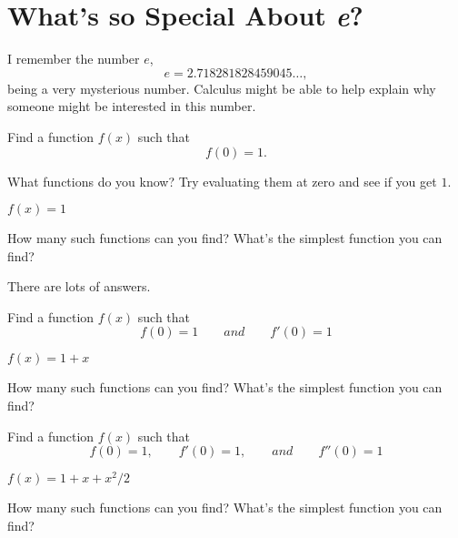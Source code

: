 \documentclass{ximera}
\begin{document}
\section{What's so Special About \textit{e}?}

I remember the number $e$,
\[
e = 2.718281828459045\dots,
\]
being a very mysterious number. Calculus might be able to help explain
why someone might be interested in this number.

\begin{question}
  Find a function $f(x)$ such that
  \[
  f(0) = 1.
  \]
  \begin{answer}
    \begin{hint}
      What functions do you know? Try evaluating them at zero and see
      if you get $1$.
    \end{hint}
    $f(x) = 1$
  \end{answer}
  \pause
  How many such functions can you find? What's the simplest function you
  can find?
  \begin{answer}
    \begin{hint}
      There are lots of answers.
    \end{hint}
  \end{answer}
\end{question}


\begin{question}
  Find a function $f(x)$ such that
  \[
  f(0) = 1\qquad and \qquad f'(0) = 1
  \]
  \begin{answer}
    $f(x) = 1+x$
  \end{answer}
  \pause
  How many such functions can you find? What's the simplest function you
  can find?
  \begin{answer}
  \end{answer}
\end{question}

\begin{question}
Find a function $f(x)$ such that
\[
f(0) = 1,\qquad f'(0) = 1,\qquad and \qquad f''(0) = 1
\]
  \begin{answer}
    $f(x) = 1+x+x^2/2$
  \end{answer}
  \pause
  How many such functions can you find? What's the simplest function you
  can find?
  \begin{answer}
  \end{answer}
\end{question}
\end{document}
